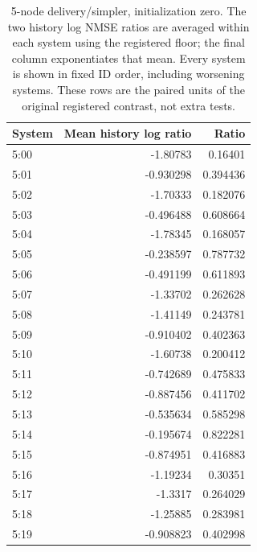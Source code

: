 \begin{table}[ht]
\centering\scriptsize
\begin{tabular}{lrr}
\toprule
System & Mean history log ratio & Ratio\\
\midrule
5:00 & -1.80783 & 0.16401\\
5:01 & -0.930298 & 0.394436\\
5:02 & -1.70333 & 0.182076\\
5:03 & -0.496488 & 0.608664\\
5:04 & -1.78345 & 0.168057\\
5:05 & -0.238597 & 0.787732\\
5:06 & -0.491199 & 0.611893\\
5:07 & -1.33702 & 0.262628\\
5:08 & -1.41149 & 0.243781\\
5:09 & -0.910402 & 0.402363\\
5:10 & -1.60738 & 0.200412\\
5:11 & -0.742689 & 0.475833\\
5:12 & -0.887456 & 0.411702\\
5:13 & -0.535634 & 0.585298\\
5:14 & -0.195674 & 0.822281\\
5:15 & -0.874951 & 0.416883\\
5:16 & -1.19234 & 0.30351\\
5:17 & -1.3317 & 0.264029\\
5:18 & -1.25885 & 0.283981\\
5:19 & -0.908823 & 0.402998\\
\bottomrule
\end{tabular}
\caption{5-node delivery/simpler, initialization zero. The two history log NMSE ratios are averaged within each system using the registered floor; the final column exponentiates that mean. Every system is shown in fixed ID order, including worsening systems. These rows are the paired units of the original registered contrast, not extra tests.}
\end{table}
